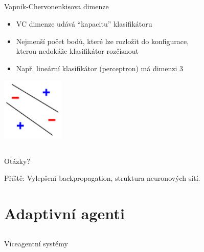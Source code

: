 \documentclass{beamer}
\begin{document}
\subsection{}
\begin{frame}{Vapnik-Chervonenkisova dimenze}
\begin{itemize}
\item VC dimenze udává ``kapacitu'' klasifikátoru
\item Nejmenší počet bodů, které lze rozložit do konfigurace, \\ kterou nedokáže klasifikátor rozčísnout
\item Např. lineární klasifikátor (perceptron) má dimenzi 3
\end{itemize}
\begin{center}
\includegraphics[height=3cm]{VC4.png}
\end{center}
\end{frame}

\subsection{}
\begin{frame}{Otázky?}
\begin{center}
Příště: Vylepšení backpropagation, struktura neuronových sítí.
\end{center}
\end{frame}

\section{Adaptivní agenti}

\subsection{}
\begin{frame}{Víceagentní systémy}
\end{frame}
\end{document}
